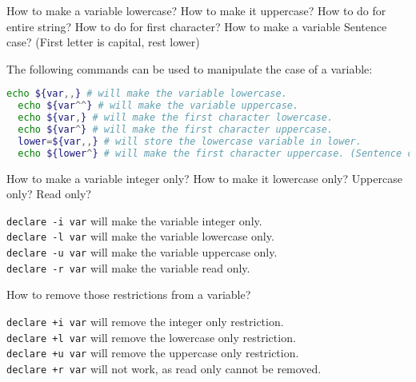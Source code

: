 \begin{qs}
  How to make a variable lowercase? How to make it uppercase?
  How to do for entire string? How to do for first character?
  How to make a variable Sentence case? (First letter is capital, rest lower)
\end{qs}

\begin{ans}
  The following commands can be used to manipulate the case of a variable:
  \begin{lstlisting}[language=bash]
  echo ${var,,} # will make the variable lowercase.
  echo ${var^^} # will make the variable uppercase.
  echo ${var,} # will make the first character lowercase.
  echo ${var^} # will make the first character uppercase.
  lower=${var,,} # will store the lowercase variable in lower.
  echo ${lower^} # will make the first character uppercase. (Sentence case) \end{lstlisting}
\end{ans}



\begin{qs}
  How to make a variable integer only? How to make it lowercase only?
  Uppercase only? Read only?
\end{qs}

\begin{ans}
  \texttt{declare -i var} will make the variable integer only. \\
  \texttt{declare -l var} will make the variable lowercase only. \\
  \texttt{declare -u var} will make the variable uppercase only. \\
  \texttt{declare -r var} will make the variable read only.
\end{ans}


\begin{qs}
  How to remove those restrictions from a variable?
\end{qs}

\begin{ans}
  \texttt{declare +i var} will remove the integer only restriction. \\
  \texttt{declare +l var} will remove the lowercase only restriction. \\
  \texttt{declare +u var} will remove the uppercase only restriction. \\
  \texttt{declare +r var} will not work, as read only cannot be removed.
\end{ans}

